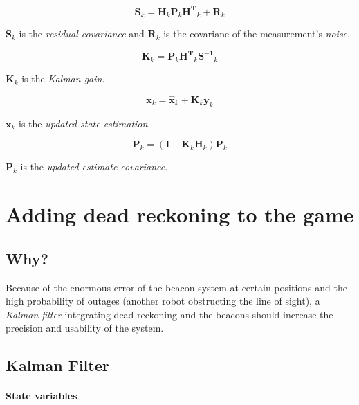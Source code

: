 \documentclass[a4paper, 12pt]{paper}
\begin{document}
\begin{equation}
    \mathbf{S}_k = \mathbf{H}_k \mathbf{P}_k \mathbf{H^T}_k + \mathbf{R}_k
\label{eq:residual_cov}
\end{equation}

$\mathbf{S}_k$ is the \emph{residual covariance} and $\mathbf{R}_k$ is the covariane
of the measurement's \emph{noise}.

\begin{equation}
    \mathbf{K}_k = \mathbf{P}_k \mathbf{H^T}_k \mathbf{S^{-1}}_k
\label{eq:kalman_gain}
\end{equation}

$\mathbf{K}_k$ is the \emph{Kalman gain}.

\begin{equation}
    \mathbf{x}_k = \mathbf{\hat x}_k + \mathbf{K}_k \mathbf{y}_k
\label{eq:updated_extimate}
\end{equation}

$\mathbf{x}_k$ is the \emph{updated state estimation}.

\begin{equation}
    \mathbf{P}_k = \left( \mathbf{I} - \mathbf{K}_k \mathbf{H}_k \right) \mathbf{P}_k
\label{eq:updated_cov}
\end{equation}

$\mathbf{P}_k$ is the \emph{updated estimate covariance}.



\section{Adding dead reckoning to the game}

\subsection{Why?}

Because of the enormous error of the beacon system at certain positions and the
high probability of outages (another robot obstructing the line of sight), a
\emph{Kalman filter} integrating dead reckoning and the beacons should increase
the precision and usability of the system.

\subsection{Kalman Filter}
\paragraph{State variables}
\end{document}
